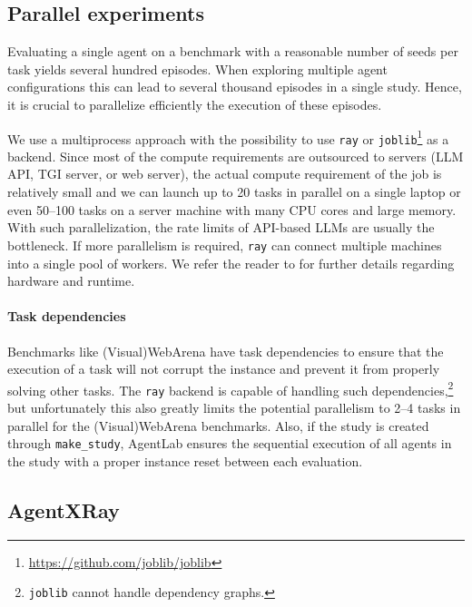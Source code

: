 \documentclass[10pt]{article} %
\newcommand{\code}[1]{\texttt{#1}}
\begin{document}
\subsection{Parallel experiments}\label{sec:parallel-experiments}

Evaluating a single agent on a benchmark with a reasonable number of seeds per task yields several hundred episodes. When exploring multiple agent configurations this can lead to several thousand episodes in a single study. Hence, it is crucial to parallelize efficiently the execution of these episodes. 

We use a multiprocess approach with the possibility to use \verb|ray| \citep{ray} or \verb|joblib|\footnote{\url{https://github.com/joblib/joblib}} as a backend. Since most of the compute requirements are outsourced to servers (LLM API, TGI server, or web server), the actual compute requirement of the job is relatively small and we can launch up to 20 tasks in parallel on a single laptop or even 50--100 tasks on a server machine with many CPU cores and large memory. With such parallelization, the rate limits of API-based LLMs are usually the bottleneck. If more parallelism is required, \verb|ray| can connect multiple machines into a single pool of workers. We refer the reader to  for further details regarding hardware and runtime.

\paragraph{Task dependencies} Benchmarks like (Visual)WebArena have task dependencies to ensure that the execution of a task will not corrupt the instance and prevent it from properly solving other tasks. The \verb|ray| backend is capable of handling such dependencies,\footnote{\code{joblib} cannot handle dependency graphs.} but unfortunately this also greatly limits the potential parallelism to 2--4 tasks in parallel for the (Visual)WebArena benchmarks. Also, if the study is created through \code{make_study}, AgentLab ensures the sequential execution of all agents in the study with a proper instance reset between each evaluation.


\subsection{AgentXRay}\label{sec:xray}
\end{document}

